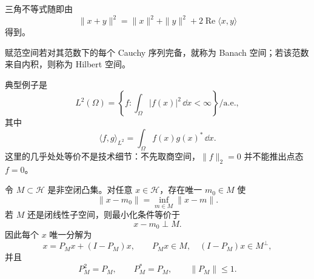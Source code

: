 三角不等式随即由
\[
\|x+y\|^2
=\|x\|^2+\|y\|^2+2\operatorname{Re}\langle x,y\rangle
\]
得到。

\begin{definition}
赋范空间若对其范数下的每个 Cauchy 序列完备，就称为 Banach 空间；若该范数来自内积，则称为 Hilbert 空间。
\end{definition}

典型例子是
\[
L^2(\Omega)=\left\{f:\int_\Omega |f(x)|^2\,\dd x<\infty\right\}/\text{a.e.},
\]
其中
\[
\boxed{\langle f,g\rangle_{L^2}
=\int_\Omega f(x)g(x)^*\,\dd x}.
\]
这里的几乎处处等价不是技术细节：不先取商空间，$\|f\|_2=0$ 并不能推出点态 $f=0$。
\begin{theorem}[闭凸集的投影与正交分解]
令 $M\subset\mathcal H$ 是非空闭凸集。对任意 $x\in\mathcal H$，存在唯一 $m_0\in M$ 使
\[
\|x-m_0\|=\inf_{m\in M}\|x-m\|.
\]
若 $M$ 还是闭线性子空间，则最小化条件等价于
\[
\boxed{x-m_0\perp M}.
\]
因此每个 $x$ 唯一分解为
\[
x=P_Mx+(I-P_M)x,
\qquad
P_Mx\in M,
\quad
(I-P_M)x\in M^\perp,
\]
并且
\[
P_M^2=P_M,
\qquad
P_M^*=P_M,
\qquad
\|P_M\|\le1.
\]
\end{theorem}

